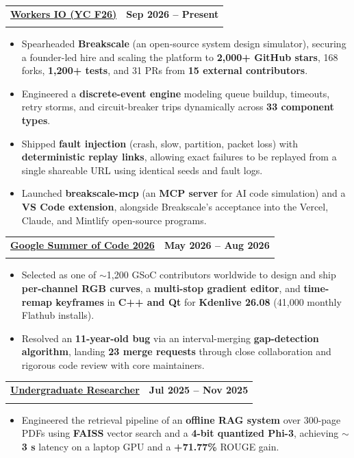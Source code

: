 \documentclass[letterpaper,10pt]{article}
\makeatletter
\newcommand{\resumeItem}[1]{
  \item\small{
    {#1 \vspace{-5pt}}
  }
}
\newcommand{\resumeSubheading}[4]{
  \vspace{-2pt}\item
    \begin{tabular*}{1.0\textwidth}[t]{l@{\extracolsep{\fill}}r}
      \textbf{\small#1} & \textbf{\small #2} \\
      \text{\small#3} & \text{\small #4} \\
      
    \end{tabular*}\vspace{-7pt}
}
\let\oldunderline\underline
\renewcommand{\underline}[1]{\oldunderline{#1\vphantom{gjpqy}}}
\newcommand{\resumeItemListStart}{\begin{itemize}}
\newcommand{\resumeItemListEnd}{\end{itemize}\vspace{-5pt}}
\makeatother
\begin{document}
    \resumeSubheading
      {\normalsize{\underline{Workers IO (YC F26)}}}{Sep 2026 -- Present}
      {{\normalsize\textbf{Developer Relations Engineer}} $|$ Deterministic simulation testing}{Remote (San Francisco)}
      \vspace{-5pt}
      \resumeItemListStart
        \resumeItem{Spearheaded \textbf{Breakscale} (an open-source system design simulator), securing a founder-led hire and scaling the platform to \textbf{2,000+ GitHub stars}, 168 forks, \textbf{1,200+ tests}, and 31 PRs from \textbf{15 external contributors}.}
        \vspace{2pt}
        \resumeItem{Engineered a \textbf{discrete-event engine} modeling queue buildup, timeouts, retry storms, and circuit-breaker trips dynamically across \textbf{33 component types}.}
        \vspace{2pt}
        \resumeItem{Shipped \textbf{fault injection} (crash, slow, partition, packet loss) with \textbf{deterministic replay links}, allowing exact failures to be replayed from a single shareable URL using identical seeds and fault logs.}
        \vspace{2pt}
        \resumeItem{Launched \textbf{breakscale-mcp} (an \textbf{MCP server} for AI code simulation) and a \textbf{VS Code extension}, alongside Breakscale's acceptance into the Vercel, Claude, and Mintlify open-source programs.}
      \resumeItemListEnd

    \resumeSubheading
      {\normalsize{\underline{Google Summer of Code 2026}}}{May 2026 -- Aug 2026}
      {{\normalsize\textbf{Kdenlive @KDE Community}} $|$ Open Source Contributor, C++ and Qt}{Remote}
      \vspace{-5pt}
      \resumeItemListStart
        \resumeItem{Selected as one of $\sim$1,200 GSoC contributors worldwide to design and ship \textbf{per-channel RGB curves}, a \textbf{multi-stop gradient editor}, and \textbf{time-remap keyframes} in \textbf{C++ and Qt} for \textbf{Kdenlive 26.08} (41,000 monthly Flathub installs).}
        \vspace{2pt}
        \resumeItem{Resolved an \textbf{11-year-old bug} via an interval-merging \textbf{gap-detection algorithm}, landing \textbf{23 merge requests} through close collaboration and rigorous code review with core maintainers.}
      \resumeItemListEnd

    \resumeSubheading
      {\normalsize{\underline{Undergraduate Researcher}}}{Jul 2025 -- Nov 2025}
      {{\normalsize\textbf{Indian Institute of Technology, Jodhpur}} $|$ Supervisor: Dr. Pratik Mazumder}{Jodhpur}
      \vspace{-5pt}
      \resumeItemListStart
        \resumeItem{Engineered the retrieval pipeline of an \textbf{offline RAG system} over 300-page PDFs using \textbf{FAISS} vector search and a \textbf{4-bit quantized Phi-3}, achieving \textbf{$\sim$3 s} latency on a laptop GPU and a \textbf{+71.77\%} ROUGE gain.}
      \resumeItemListEnd
\end{document}
